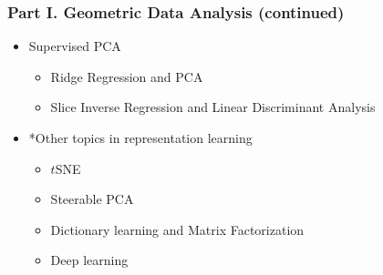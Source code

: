 \documentclass[10pt,mathserif]{beamer}
\begin{document}
\begin{frame}
\frametitle{Part I. Geometric Data Analysis (continued)}
\begin{itemize}\itemsep=12pt
\item Supervised PCA
\vspace*{0.5em}
\begin{itemize}
\item Ridge Regression and PCA
\item Slice Inverse Regression and Linear Discriminant Analysis
\end{itemize}
\vspace*{0.5em}
\item *Other topics in representation learning
\vspace*{0.5em}
\begin{itemize}
\item $t$SNE
\item Steerable PCA
\item Dictionary learning and Matrix Factorization
\item Deep learning
\end{itemize}
\end{itemize}
\end{frame}
\end{document}
